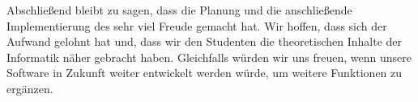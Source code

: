 Abschließend bleibt zu sagen, dass die Planung und die anschließende
Implementierung des \gtitools sehr viel Freude gemacht hat. Wir hoffen, dass sich
der Aufwand gelohnt hat und, dass wir den Studenten die theoretischen Inhalte der
Informatik näher gebracht haben. Gleichfalls würden wir uns freuen, wenn unsere
Software in Zukunft weiter entwickelt werden würde, um weitere Funktionen zu
ergänzen.\vspace{10pt}
